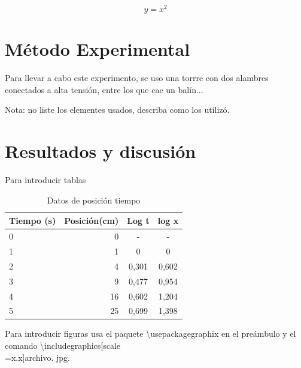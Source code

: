 \documentclass[12]{article}
\begin{document}
\begin{equation}
	y = x^{2}
\end{equation}


\section{M\'etodo Experimental}

Para llevar a cabo este experimento, se uso una torrre con dos alambres conectados a alta tensi\'on, entre los que cae un bal\'in...

Nota: no liste los elementes usados, describa como los utiliz\'o.

\section{Resultados y discusi\'on}

Para introducir tablas

\begin{table}[h]
	\centering
		\caption{Datos de posici\'on tiempo}
  	\begin{tabular}{|l|r|c|c|} %
		\hline %
		Tiempo (s) & Posici\'on(cm) & Log t & log x \\
		\hline
		0         & 0          & -     & -\\
		\hline
		1        & 1         & 0 & 0 \\ %
		\hline
		2         & 4          & 0,301     & 0,602\\
		\hline
		3          & 9          & 0,477     & 0,954\\
		\hline
		4          & 16          & 0,602    & 1,204\\
		\hline
		5         & 25         & 0,699     & 1,398\\
		\hline
		\end{tabular}
	
	\label{tab:Datos1}
\end{table}

\newpage %

\noindent
Para introducir figuras usa el paquete  \textbackslash usepackage{graphix} en el pre\'ambulo 
y el comando \textbackslash includegraphics[scale\\=x.x]{archivo. jpg}.
\end{document}
